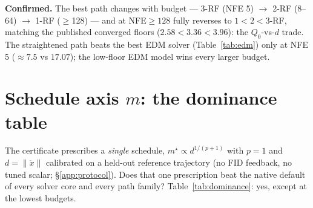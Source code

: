 \documentclass[11pt]{article}
\newcommand{\norm}[1]{\lVert #1 \rVert}
\begin{document}
\noindent\textbf{Confirmed.} The best path changes with budget ---
3-RF (NFE 5) $\to$ 2-RF (8--64) $\to$ 1-RF ($\ge$128) --- and at NFE${\ge}128$
fully reverses to $1\!<\!2\!<\!3$-RF, matching the published converged floors
($2.58\!<\!3.36\!<\!3.96$): the $Q_0$-vs-$d$ trade. The straightened path
beats the best EDM solver (Table~\ref{tab:edm}) only at NFE 5 ($\approx7.5$ vs
$17.07$); the low-floor EDM model wins every larger budget.

\section{Schedule axis $m$: the dominance table}
\label{sec:sched}
The certificate prescribes a \emph{single} schedule,
$m^\star\!\propto d^{1/(p+1)}$ with $p\!=\!1$ and $d=\norm{\ddot x}$
calibrated on a held-out reference trajectory (no FID feedback, no tuned
scalar; \S\ref{app:protocol}). Does that one prescription beat the native
default of every solver core and every path family?
Table~\ref{tab:dominance}: yes, except at the lowest budgets.
\end{document}
